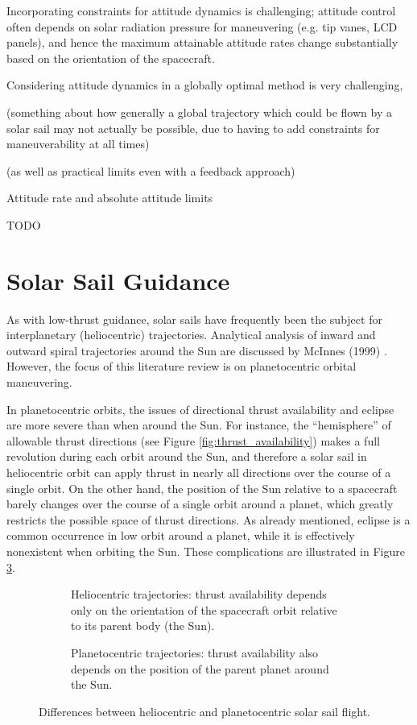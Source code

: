 Incorporating constraints for attitude dynamics is challenging; attitude control often depends on solar radiation pressure for maneuvering (e.g. tip vanes, LCD panels), and hence the maximum attainable attitude rates change substantially based on the orientation of the spacecraft.

Considering attitude dynamics in a globally optimal method is very challenging,


(something about how generally a global trajectory which could be flown by a solar sail may not actually be possible, due to having to add constraints for maneuverability at all times)

(as well as practical limits even with a feedback approach)

Attitude rate and absolute attitude limits

TODO


\section{Solar Sail Guidance}
As with low-thrust guidance, solar sails have frequently been the subject for interplanetary (heliocentric) trajectories. Analytical analysis of inward and outward spiral trajectories around the Sun are discussed by McInnes (1999) \cite{mcinnes}. However, the focus of this literature review is on planetocentric orbital maneuvering.

In planetocentric orbits, the issues of directional thrust availability and eclipse are more severe than when around the Sun. For instance, the ``hemisphere'' of allowable thrust directions (see Figure \ref{fig:thrust_availability}) makes a full revolution during each orbit around the Sun, and therefore a solar sail in heliocentric orbit can apply thrust in nearly all directions over the course of a single orbit. On the other hand, the position of the Sun relative to a spacecraft barely changes over the course of a single orbit around a planet, which greatly restricts the possible space of thrust directions. As already mentioned, eclipse is a common occurrence in low orbit around a planet, while it is effectively nonexistent when orbiting the Sun. These complications are illustrated in Figure \ref{fig:angle_availability}.

\begin{figure}[H]
  \centering
  \begin{subfigure}[t]{0.45\textwidth}
    
    \caption{Heliocentric trajectories: thrust availability depends only on the orientation of the spacecraft orbit relative to its parent body (the Sun).}
    \label{fig:angle_availability_sun}
  \end{subfigure}
  \hfill
  \begin{subfigure}[t]{0.45\textwidth}
    
    \caption{Planetocentric trajectories: thrust availability also depends on the position of the parent planet around the Sun.}
    \label{fig:angle_availability_earth}
  \end{subfigure}
  \caption{Differences between heliocentric and planetocentric solar sail flight.}
  \label{fig:angle_availability}
\end{figure}

